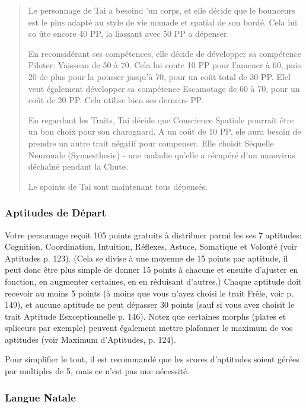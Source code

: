 \begin{quotation}
Le personnage de Tai a besoind 'un corps, et elle décide que le bounceurs est le plus adapté au style de vie nomade et spatial de son bordé. Cela lui co ûte encore 40 PP, la liassant avec 50 PP a dépenser. 

En reconsidérant ses compétences, elle décide de développer sa compétence Piloter: Vaisseau de 50 à 70. Cela lui coute 10 PP pour l'amener à 60, puis 20 de plus pour la pousser jusqu'à 70, pour un coût total de 30 PP. Elel veut également développer sa compétence Escamotage de 60 à 70, pour un coût de 20 PP. Cela utilise bien ses derneirs PP. 

En regardant les Traits, Tai décide que Conscience Spatiale pourrait être un bon choix pour son charognard. A un coût de 10 PP, ele aura besoin de prendre un autre trait négatif pour compenser. Elle choisit Séquelle Neuronale (Synaesthesie) - une maladie qu'elle a récupéré d'un nanovirus déchaîné pendant la Chute. 

Le spoints de Tai sont maintenant tous dépensés. \end{quotation} 

\subsubsection{Aptitudes de Départ} \label{sec:starting-aptitudes} 

Votre personnage reçoit 105 points gratuits à distribuer parmi les ses 7 aptitudes: Cognition, Coordination, Intuition, Réflexes, Astuce, Somatique et Volonté (voir Aptitudes p. 123). (Cela se divise à une moyenne de 15 points par aptitude, il peut donc être plus simple de donner 15 points à chacune et ensuite d'ajuster en fonction, en augmenter certaines, en en réduisant d'autres.) Chaque aptitude doit recevoir au moins 5 points (à moins que vous n'ayez choisi le trait Frêle, voir p. 149), et aucune aptitude ne peut dépasser 30 points (sauf si vous avez choisit le trait Aptitude Esxceptionnelle p. 146). Notez que certaines morphs (plates et spliceurs par exemple) peuvent également mettre plafonner le maximum de vos aptitudes (voir Maximum d'Aptitudes, p. 124). 

Pour simplifier le tout, il est recommandé que les scores d'aptitudes soient gérées par multiples de 5, mais ce n'est pas une nécessité. 

\subsubsection{Langue Natale} \label{sec:native-tongue} 

